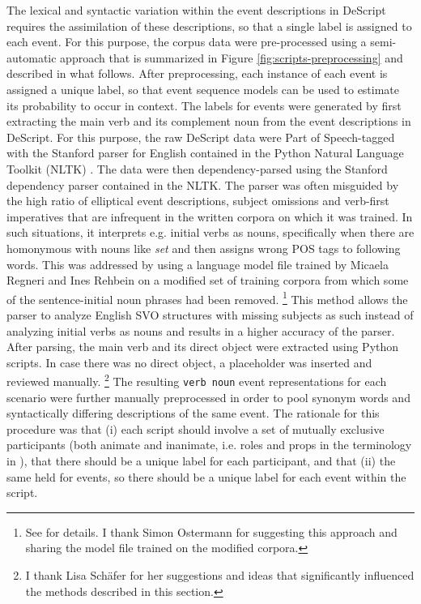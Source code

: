 The lexical and syntactic variation within the event descriptions in DeScript requires the assimilation of these descriptions, so that a single label is assigned to each event. For this purpose, the corpus data were pre-processed using a semi-automatic approach that is summarized in Figure \ref{fig:scripts-preprocessing} and described in what follows. After preprocessing, each instance of each event is assigned a unique label, so that event sequence models can be used to estimate its probability to occur in context. The labels for events were generated by first extracting the main verb and its complement noun from the event descriptions in DeScript. For this purpose, the raw DeScript data were Part of Speech-tagged with the Stanford parser \citep{klein.manning2003} for English contained in the Python Natural Language Toolkit (NLTK) \citep{loper.bird2002}. The data were then dependency-parsed using the Stanford dependency parser contained in the NLTK. The parser was often misguided by the high ratio of elliptical event descriptions, subject omissions and verb-first imperatives that are infrequent in the written corpora on which it was trained. In such situations, it interprets e.g. initial verbs as nouns, specifically when there are homonymous with nouns like \textit{set} and then assigns wrong POS tags to following words. This was addressed by using a language model file trained by Micaela Regneri and Ines Rehbein on a modified set of training corpora from which some of the sentence-initial noun phrases had been removed.%
%
\footnote{See \citet[49-50]{regneri2013} for details. I thank Simon Ostermann for suggesting this approach and sharing the model file trained on the modified corpora.}\afterfn%
%
This method allows the parser to analyze English SVO structures with missing subjects as such instead of analyzing initial verbs as nouns and results in a higher accuracy of the parser. After parsing, the main verb and its direct object were extracted using Python scripts. In case there was no direct object, a placeholder was inserted and reviewed manually.%
% 
\footnote{I thank Lisa Schäfer for her suggestions and ideas that significantly influenced the methods described in this section.}\afterfn%
%
The resulting \texttt{verb noun} event representations for each scenario were further manually preprocessed in order to pool synonym words and syntactically differing descriptions of the same event. The rationale for this procedure was that (i) each script should involve a set of mutually exclusive participants (both animate and inanimate, i.e. roles and props in the terminology in \citet{schank.abelson1977}), that there should be a unique label for each participant, and that (ii) the same held for events, so there should be a unique label for each event within the script.%

